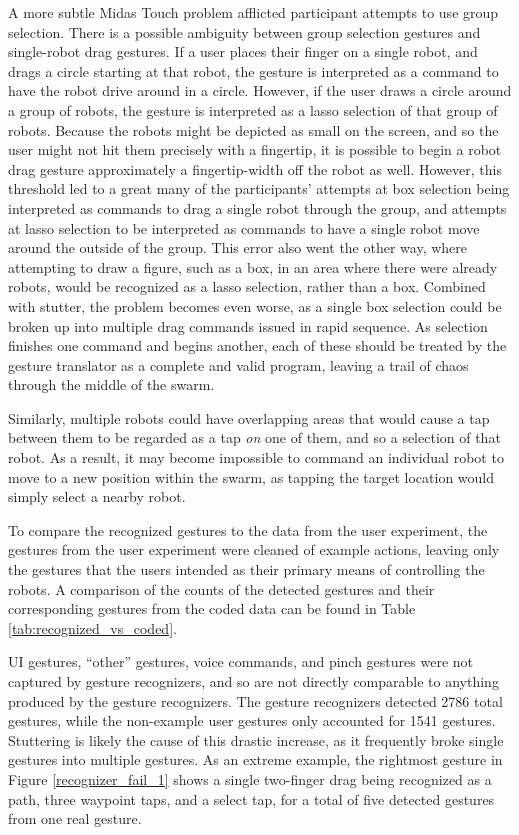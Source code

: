 A more subtle Midas Touch problem afflicted participant attempts to use group selection. 
There is a possible ambiguity between group selection gestures and single-robot drag gestures. 
If a user places their finger on a single robot, and drags a circle starting at that robot, the gesture is interpreted as a command to have the robot drive around in a circle.
However, if the user draws a circle around a group of robots, the gesture is interpreted as a lasso selection of that group of robots. 
Because the robots might be depicted as small on the screen, and so the user might not hit them precisely with a fingertip, it is possible to begin a robot drag gesture approximately a fingertip-width off the robot as well. 
However, this threshold led to a great many of the participants' attempts at box selection being interpreted as commands to drag a single robot through the group, and attempts at lasso selection to be interpreted as commands to have a single robot move around the outside of the group. 
This error also went the other way, where attempting to draw a figure, such as a box, in an area where there were already robots, would be recognized as a lasso selection, rather than a box.
Combined with stutter, the problem becomes even worse, as a single box selection could be broken up into multiple drag commands issued in rapid sequence. 
As selection finishes one command and begins another, each of these should be treated by the gesture translator as a complete and valid program, leaving a trail of chaos through the middle of the swarm. 

Similarly, multiple robots could have overlapping areas that would cause a tap between them to be regarded as a tap \emph{on} one of them, and so a selection of that robot.
As a result, it may become impossible to command an individual robot to move to a new position within the swarm, as tapping the target location would simply select a nearby robot. 

To compare the recognized gestures to the data from the user experiment, the gestures from the user experiment were cleaned of example actions, leaving only the gestures that the users intended as their primary means of controlling the robots. 
A comparison of the counts of the detected gestures and their corresponding gestures from the coded data can be found in Table \ref{tab:recognized_vs_coded}.

UI gestures, ``other'' gestures, voice commands, and pinch gestures were not captured by gesture recognizers, and so are not directly comparable to anything produced by the gesture recognizers. 
The gesture recognizers detected 2786 total gestures, while the non-example user gestures only accounted for 1541 gestures. 
Stuttering is likely the cause of this drastic increase, as it frequently broke single gestures into multiple gestures. 
As an extreme example, the rightmost gesture in Figure \ref{recognizer_fail_1} shows a single two-finger drag being recognized as a path, three waypoint taps, and a select tap, for a total of five detected gestures from one real gesture. 

